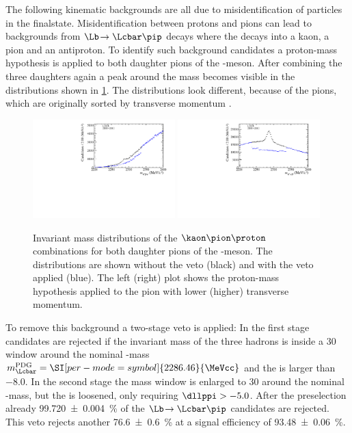 The following kinematic backgrounds are all due to misidentification of particles in the finalstate.
Misidentification between protons and pions can lead to backgrounds from $\Lb\!\to\Lcbar\pip$ decays where the \Lcbar decays into a kaon, a pion and an antiproton.
To identify such background candidates a proton-mass hypothesis is applied to both daughter pions of the \Dm-meson.
After combining the three \D daughters again a peak around the \Lc mass becomes visible in the distributions shown in \cref{fig:LcVeto}.
The distributions look different, because of the pions, which are originally sorted by transverse momentum \pt.
\begin{figure}[tbp]
    \centering
    \includegraphics[width=0.49\textwidth]{06selection/figs/LcHypo1.pdf}
    \includegraphics[width=0.49\textwidth]{06selection/figs/LcHypo2.pdf}
    \caption{Invariant mass distributions of the $\kaon\pion\proton$ combinations for both daughter pions of the \Dm-meson.
    The distributions are shown without the veto (black) and with the veto applied (blue).
    The left (right) plot shows the proton-mass hypothesis applied to the pion with lower (higher) transverse momentum.}
    \label{fig:LcVeto}
\end{figure}
To remove this background a two-stage veto is applied: In the first stage candidates are rejected if the invariant mass of the three hadrons is inside a \SI[per-mode=symbol]{30}{\MeVcc}  window around the nominal \Lcbar-mass $m_\Lcbar^{\text{PDG}}=\SI[per-mode=symbol]{2286.46}{\MeVcc}$ and the \dllppi is larger than \num{-8.0}.
In the second stage the mass window is enlarged to \SI[per-mode=symbol]{30}{\MeVcc} around the nominal \Lcbar-mass, but the \dllppi is loosened, only requiring $\dllppi>-5.0$.
After the preselection already \SI{99.720\pm0.004}{\percent} of the $\Lb\!\to\Lcbar\pip$ candidates are rejected.
This veto rejects another \SI{76.6\pm0.6}{\percent} at a signal efficiency of \SI{93.48\pm0.06}{\percent}.

